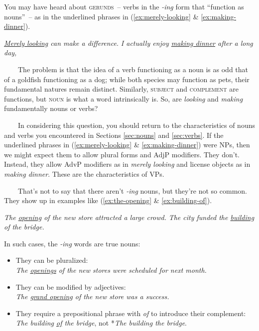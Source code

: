 \begin{tcolorbox}[title=What about gerunds?\is{gerund}, colback=white]

You may have heard about \textsc{gerunds}~-- verbs in the \textit{-ing} form that ``function as nouns''~-- as in the underlined phrases in (\ref{ex:merely-looking} \& \ref{ex:making-dinner}).

\ea\textit{\uline{Merely looking} can make a difference.}\label{ex:merely-looking}
\ex\textit{I actually enjoy \uline{making dinner} after a long day,} \label{ex:making-dinner}
\z

~~~~The problem is that the idea of a verb functioning as a noun is as odd that of a goldfish functioning as a dog; while both species may function as pets, their fundamental natures remain distinct. Similarly, \textsc{subject} and \textsc{complement} are functions, but \textsc{noun} is what a word intrinsically is. So, are \textit{looking} and \textit{making} fundamentally nouns or verbs?

~~~~In considering this question, you should return to the characteristics of nouns and verbs you encountered in Sections \ref{sec:nouns} and \ref{sec:verbs}. If the underlined phrases in (\ref{ex:merely-looking} \& \ref{ex:making-dinner}) were NPs, then we might expect them to allow plural forms and AdjP modifiers. They don't. Instead, they allow AdvP modifiers as in \textit{merely looking} and license objects as in \textit{making dinner}. These are the characteristics of VPs.

~~~~That's not to say that there aren't \textit{-ing} nouns, but they're not so common. They show up in examples like  (\ref{ex:the-opening} \& \ref{ex:building-of}).

\ea    \textit{The \uline{opening} of the new store attracted a large crowd.} \label{ex:the-opening}
\ex   \textit{The city funded the \uline{building} of the bridge.}\label{ex:building-of}
\z

In such cases, the \textit{-ing} words are true nouns:

\begin{itemize}[nosep]
    \item They can be pluralized: \\\textit{The \uline{openings} of the new stores were scheduled for next month.}
    \item They can be modified by adjectives: \\\textit{The \uline{grand opening} of the new store was a success.}
    \item They require a prepositional phrase with \textit{of} to introduce their complement: \textit{The building \uline{of} the bridge}, not *\textit{The building the bridge}.
\end{itemize}


\end{tcolorbox}

